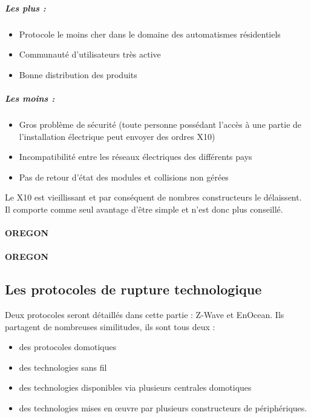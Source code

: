 \documentclass[a4paper,10pt]{article}
\begin{document}
\subparagraph{Les plus :}
\begin{itemize}
\item Protocole le moins cher dans le domaine des automatismes résidentiels
\item Communauté d'utilisateurs très active
\item Bonne distribution des produits
\end{itemize}
\subparagraph{Les moins :}
\begin{itemize}
\item Gros problème de sécurité (toute personne possédant l'accès à une partie de l'installation électrique peut envoyer des ordres X10)
\item Incompatibilité entre les réseaux électriques des différents pays
\item Pas de retour d'état des modules et collisions non gérées
\end{itemize}
Le X10 est vieillissant et par conséquent de nombres constructeurs le délaissent. Il comporte comme seul avantage d'être simple et n'est donc plus conseillé.
\paragraph{OREGON}
\paragraph{OREGON}


\subsection{Les protocoles de rupture technologique}
Deux protocoles seront détaillés dans cette partie : Z-Wave et EnOcean. Ils partagent de nombreuses similitudes, ils sont tous deux :
\begin{itemize}
\item des protocoles domotiques
\item des technologies sans fil
\item des technologies disponibles via plusieurs centrales domotiques
\item des technologies mises en œuvre par plusieurs constructeurs de périphériques.

\end{itemize}
\end{document}
